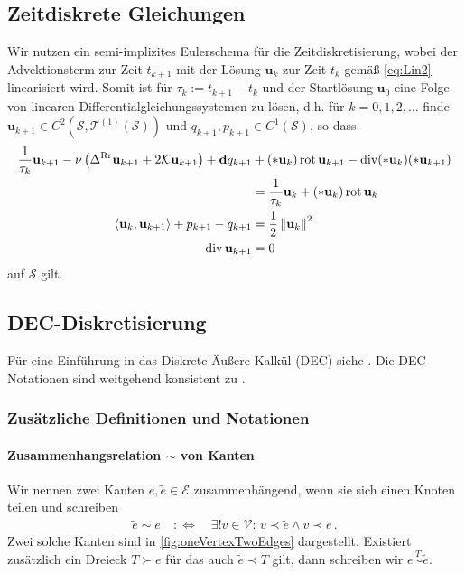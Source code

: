 \documentclass[a4paper,11pt]{scrartcl}
\newcommand{\U}{u} %
\newcommand{\Ub}{\mathbf{\U}} %
\renewcommand{\P}{p} %
\newcommand{\gauss}{\mathcal{K}} %
\newcommand{\surf}{\mathcal{S}} %
\newcommand{\uspace}{\mathcal{T}^{(1)}(\surf)} %
\renewcommand{\div}{\operatorname{div}} %
\newcommand{\rot}{\operatorname{rot}} %
\newcommand{\exd}{\mathbf{d}} %
\newcommand{\lrr}{\Delta^{\textup{Rr}}} %
\newcommand{\Vs}{\mathcal{V}} %
\newcommand{\Es}{\mathcal{E}} %
\newcommand{\face}{T} %
\newcommand{\facesim}{\overset{\face}{\sim}}
\newcommand{\formPeriod}{\,\text{.}}
\begin{document}
\subsection{Zeitdiskrete Gleichungen}
  Wir nutzen ein semi-implizites Eulerschema für die Zeitdiskretisierung, 
  wobei der Advektionsterm zur Zeit \( t_{k+1} \) mit der Lösung \( \Ub_{k} \) zur Zeit \( t_{k} \) gemäß \eqref{eq:Lin2} linearisiert wird.
  Somit ist für \( \tau_{k} := t_{k+1} - t_{k} \) und der Startlösung \( \Ub_{0} \) eine Folge von linearen Differentialgleichungssystemen zu lösen,
  d.h. für \( k=0,1,2,\ldots \) finde \( \Ub_{k+1}\in C^{2}\left(\surf, \uspace\right) \) und \( q_{k+1},p_{k+1}\in C^{1}(\surf) \), so dass
  \begin{align}
    \frac{1}{\tau_{k}}\Ub_{k+1} - \nu\left( \lrr\Ub_{k+1} + 2\gauss\Ub_{k+1} \right) + \exd q_{k+1}
        &+ (*\Ub_{k})\rot\Ub_{k+1} - \div(*\Ub_{k})(*\Ub_{k+1}) \notag\\
              &= \frac{1}{\tau_{k}}\Ub_{k} + (*\Ub_{k})\rot\Ub_{k} \label{eq:NS1DisTime}\\
    \left\langle \Ub_{k}, \Ub_{k+1} \right\rangle + \P_{k+1} - q_{k+1} 
          &= \frac{1}{2}\left\| \Ub_{k} \right\|^{2} \label{eq:NS3DisTime}\\
    \div\Ub_{k+1} &= 0
  \end{align}
  auf \( \surf \) gilt.

\subsection{DEC-Diskretisierung}
  Für eine Einführung in das Diskrete Äußere Kalkül (DEC) siehe \cite{Desbrun2005, Hirani2003, DiplomIngo2014}.
  Die DEC-Notationen sind weitgehend konsistent zu \cite{Nestler2016}.

  \subsubsection{Zusätzliche Definitionen und Notationen}
    \paragraph{Zusammenhangsrelation \( \sim \) von Kanten}
      Wir nennen zwei Kanten \( e,\tilde{e}\in\Es \) zusammenhängend, wenn sie sich einen Knoten teilen und schreiben
      \begin{align}
        \tilde{e} \sim e \quad :\Longleftrightarrow\quad
          \exists!v\in\Vs:\, v\prec\tilde{e} \wedge v\prec e \formPeriod
      \end{align}
      Zwei solche Kanten sind in \autoref{fig:oneVertexTwoEdges} dargestellt.
      Existiert zusätzlich ein Dreieck \( \face\succ e \) für das auch \( \tilde{e}\prec\face \) gilt, 
      dann schreiben wir \( e \facesim \tilde{e} \).
\end{document}
